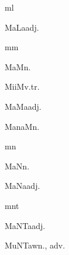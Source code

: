 \begin{multicols*}{2}
\begin{dictroot}{m}{l}
    \begin{dictentry}{MaLa}{adj.}
    \end{dictentry}
\end{dictroot}

\begin{dictroot}{m}{m}
    \begin{dictentry}{MaM}{n.}
    \end{dictentry}
    \begin{dictentry}{MiiM}{v.tr.}
    \end{dictentry}
    \begin{dictentry}{MaMa}{adj.}
    \end{dictentry}
    \begin{dictentry}{ManaM}{n.}
    \end{dictentry}
\end{dictroot}

\begin{dictroot}{m}{n}
    \begin{dictentry}{MaN}{n.}
    \end{dictentry}
    \begin{dictentry}{MaNa}{adj.}
    \end{dictentry}
\end{dictroot}

\begin{dictroot}{m}{nt}
    \begin{dictentry}{MaNTa}{adj.}
    \end{dictentry}
    \begin{dictentry}{MuNTaw}{n., adv.}
    \end{dictentry}
\end{dictroot}


\end{multicols*}
